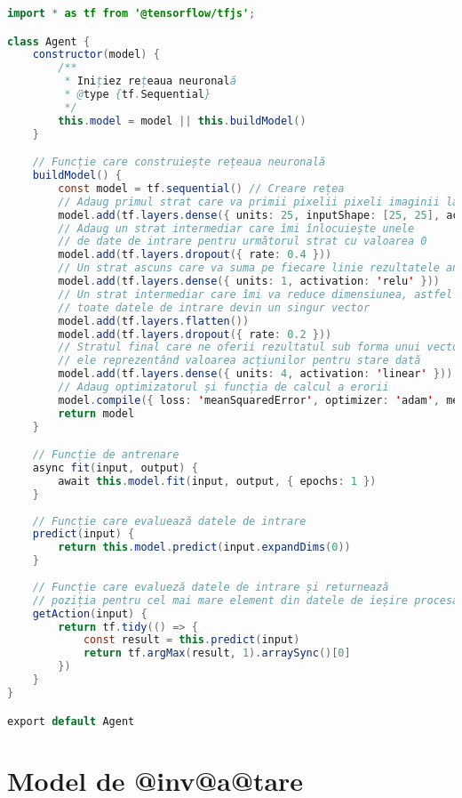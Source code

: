 \begin{lstlisting}[language=Java, caption={Structura clasei Agent}]
import * as tf from '@tensorflow/tfjs';

class Agent {
    constructor(model) {
        /**
         * Inițiez rețeaua neuronală
         * @type {tf.Sequential}
         */
        this.model = model || this.buildModel()
    }

    // Funcție care construiește rețeaua neuronală
    buildModel() {
        const model = tf.sequential() // Creare rețea
        // Adaug primul strat care va primii pixelii pixeli imaginii labirintului
        model.add(tf.layers.dense({ units: 25, inputShape: [25, 25], activation: 'relu' }))
        // Adaug un strat intermediar care îmi înlocuiește unele  
        // de date de intrare pentru următorul strat cu valoarea 0
        model.add(tf.layers.dropout({ rate: 0.4 }))
        // Un strat ascuns care va suma pe fiecare linie rezultatele anterioare
        model.add(tf.layers.dense({ units: 1, activation: 'relu' }))
        // Un strat intermediar care îmi va reduce dimensiunea, astfel din matrice toate
        // toate datele de intrare devin un singur vector
        model.add(tf.layers.flatten())
        model.add(tf.layers.dropout({ rate: 0.2 }))
        // Stratul final care ne oferii rezultatul sub forma unui vector de 4 elemente
        // ele reprezentând valoarea acțiunilor pentru stare dată
        model.add(tf.layers.dense({ units: 4, activation: 'linear' }))
        // Adaug optimizatorul și funcția de calcul a erorii
        model.compile({ loss: 'meanSquaredError', optimizer: 'adam', metrics: ['accuracy'] })
        return model
    }

    // Funcție de antrenare
    async fit(input, output) {
        await this.model.fit(input, output, { epochs: 1 })
    }
    
    // Funcție care evaluează datele de intrare
    predict(input) {
        return this.model.predict(input.expandDims(0))
    }
    
    // Funcție care evalueză datele de intrare și returnează
    // poziția pentru cel mai mare element din datele de ieșire procesate
    getAction(input) {
        return tf.tidy(() => {
            const result = this.predict(input)
            return tf.argMax(result, 1).arraySync()[0]
        })
    }
}

export default Agent
\end{lstlisting}

\section{Model de @inv@a@tare}

